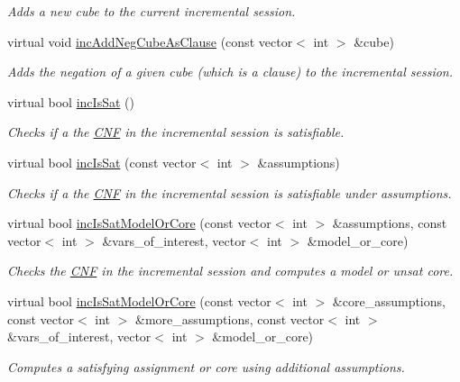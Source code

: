 \begin{DoxyCompactItemize}
\begin{DoxyCompactList}\small\item\em Adds a new cube to the current incremental session. \end{DoxyCompactList}\item 
virtual void \hyperlink{classMiniSatApi_a49afe5c41bb036a31f65f98621e82846}{inc\-Add\-Neg\-Cube\-As\-Clause} (const vector$<$ int $>$ \&cube)
\begin{DoxyCompactList}\small\item\em Adds the negation of a given cube (which is a clause) to the incremental session. \end{DoxyCompactList}\item 
virtual bool \hyperlink{classMiniSatApi_a4c6ba65381002eb3f90e8e0df1606759}{inc\-Is\-Sat} ()
\begin{DoxyCompactList}\small\item\em Checks if a the \hyperlink{classCNF}{C\-N\-F} in the incremental session is satisfiable. \end{DoxyCompactList}\item 
virtual bool \hyperlink{classMiniSatApi_a40421bac2739bacb68f3c7083810694b}{inc\-Is\-Sat} (const vector$<$ int $>$ \&assumptions)
\begin{DoxyCompactList}\small\item\em Checks if a the \hyperlink{classCNF}{C\-N\-F} in the incremental session is satisfiable under assumptions. \end{DoxyCompactList}\item 
virtual bool \hyperlink{classMiniSatApi_afb886d40bb45b5cf2fadb7aee1a06b3e}{inc\-Is\-Sat\-Model\-Or\-Core} (const vector$<$ int $>$ \&assumptions, const vector$<$ int $>$ \&vars\-\_\-of\-\_\-interest, vector$<$ int $>$ \&model\-\_\-or\-\_\-core)
\begin{DoxyCompactList}\small\item\em Checks the \hyperlink{classCNF}{C\-N\-F} in the incremental session and computes a model or unsat core. \end{DoxyCompactList}\item 
virtual bool \hyperlink{classMiniSatApi_a776b2b0563b52f52152dcec931b7f557}{inc\-Is\-Sat\-Model\-Or\-Core} (const vector$<$ int $>$ \&core\-\_\-assumptions, const vector$<$ int $>$ \&more\-\_\-assumptions, const vector$<$ int $>$ \&vars\-\_\-of\-\_\-interest, vector$<$ int $>$ \&model\-\_\-or\-\_\-core)
\begin{DoxyCompactList}\small\item\em Computes a satisfying assignment or core using additional assumptions. \end{DoxyCompactList}\item 

\end{DoxyCompactItemize}

